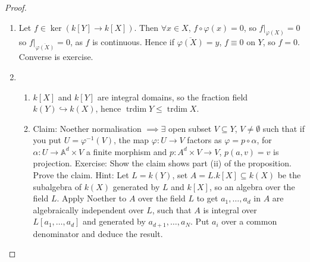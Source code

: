 \documentclass{article}
\newcommand{\A}{\mathbb{A}}
\DeclareMathOperator{\trdim}{trdim}
\begin{document}
\begin{proof}
    \begin{enumerate}[label=(\alph*)]
        \item Let $f \in \ker(k[Y] \to k[X])$. Then $\forall x \in X$, $f \circ \varphi (x) = 0$, so $f|_{\varphi(X)} = 0$ so $f|_{\overline{\varphi(X)}} = 0$, as $f$ is continuous.
            Hence if $\overline{\varphi(X)} = y$, $f \equiv 0$ on $Y$, so $f = 0$. Converse is exercise.
        \item
            \begin{enumerate}[label=(\roman*)]
            \item $k[X]$ and $k[Y]$ are integral domains, so the fraction field $k(Y) \hookrightarrow k(X)$, hence $\trdim Y \leq \trdim X$.
            \item Claim: Noether normalisation $\implies \exists$ open subset $V \subseteq Y$, $V \neq \emptyset $ such that if you put $U = \varphi^{-1}(V)$, the map $\varphi: U \to V$ factors as $\varphi = p \circ \alpha$, for $\alpha: U \to \A^d \times V$ a finite morphism and $p: A^d \times V \to V$, $p(a, v) = v$ is projection.
                Exercise: Show the claim shows part (ii) of the proposition. Prove the claim. Hint: Let $L = k(Y)$, set $A = L. k[X] \subseteq k(X)$ be the subalgebra of $k(X)$ generated by $L$ and $k[X]$, so an algebra over the field $L$.
                Apply Noether to $A$ over the field $L$ to get $a_1, \dotsc, a_d$ in $A$ are algebraically independent over $L$, such that $A$ is integral over $L[a_1, \dotsc, a_d]$ and generated by $a_{d+1}, \dots, a_N$.
                Put $a_i$ over a common denominator and deduce the result.
            \end{enumerate}
    \end{enumerate}
\end{proof}
\end{document}
